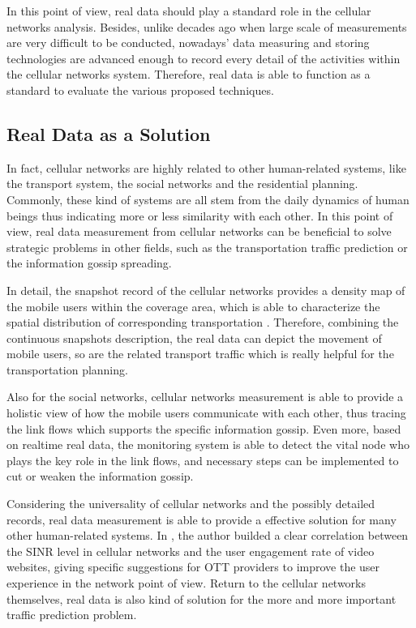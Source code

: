 {In this point of view, real data should play a standard role in the cellular networks analysis. Besides, unlike decades ago when large scale of measurements are very difficult to be conducted, nowadays' data measuring and storing technologies are advanced enough to record every detail of the activities within the cellular networks system. Therefore, real data is able to function as a standard to evaluate the various proposed techniques.

\subsection{Real Data as a Solution}
In fact, cellular networks are highly related to other human-related systems, like the transport system, the social networks and the residential planning. Commonly, these kind of systems are all stem from the daily dynamics of human beings thus indicating more or less similarity with each other. In this point of view, real data measurement from cellular networks can be beneficial to solve strategic problems in other fields, such as the transportation traffic prediction or the information gossip spreading.

In detail, the snapshot record of the cellular networks provides a density map of the mobile users within the coverage area, which is able to characterize the spatial distribution of corresponding transportation \cite{caceres2012traffic}. Therefore, combining the continuous snapshots description, the real data can depict the movement of mobile users, so are the related transport traffic which is really helpful for the transportation planning.

Also for the social networks, cellular networks measurement is able to provide a holistic view of how the mobile users communicate with each other, thus tracing the link flows which supports the specific information gossip. Even more, based on realtime real data, the monitoring system is able to detect the vital node who plays the key role in the link flows, and necessary steps can be implemented to cut or weaken the information gossip.

Considering the universality of cellular networks and the possibly detailed records, real data measurement is able to provide a effective solution for many other human-related systems. In \cite{shafiq2014understanding}, the author builded a clear correlation between the SINR level in cellular networks and the user engagement rate of video websites, giving specific suggestions for OTT providers to improve the user experience in the network point of view. Return to the cellular networks themselves, real data is also kind of solution for the more and more important traffic prediction problem.

}

